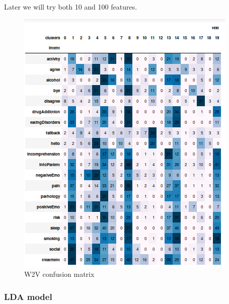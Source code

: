 \documentclass[11pt]{article}
\begin{document}
Later we will try both 10 and 100 features.

\begin{figure}[h]
	\centering
 	\includegraphics[scale=0.7]{best_w2v_cm.png}
	\caption{W2V confusion matrix}
 \label{w2v_cm_mat}
 \end{figure}
\FloatBarrier

\subsubsection{LDA model}
\end{document}
